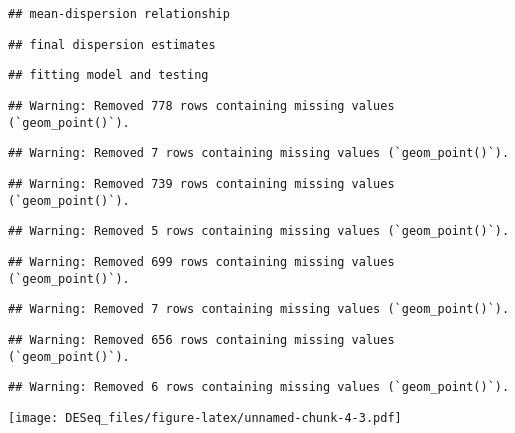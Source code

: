 \documentclass[
]{article}
\begin{document}
\begin{verbatim}
## mean-dispersion relationship
\end{verbatim}

\begin{verbatim}
## final dispersion estimates
\end{verbatim}

\begin{verbatim}
## fitting model and testing
\end{verbatim}

\begin{verbatim}
## Warning: Removed 778 rows containing missing values (`geom_point()`).
\end{verbatim}

\begin{verbatim}
## Warning: Removed 7 rows containing missing values (`geom_point()`).
\end{verbatim}

\begin{verbatim}
## Warning: Removed 739 rows containing missing values (`geom_point()`).
\end{verbatim}

\begin{verbatim}
## Warning: Removed 5 rows containing missing values (`geom_point()`).
\end{verbatim}

\begin{verbatim}
## Warning: Removed 699 rows containing missing values (`geom_point()`).
\end{verbatim}

\begin{verbatim}
## Warning: Removed 7 rows containing missing values (`geom_point()`).
\end{verbatim}

\begin{verbatim}
## Warning: Removed 656 rows containing missing values (`geom_point()`).
\end{verbatim}

\begin{verbatim}
## Warning: Removed 6 rows containing missing values (`geom_point()`).
\end{verbatim}

\texttt{[image: DESeq\_files/figure-latex/unnamed-chunk-4-3.pdf]}
\end{document}
